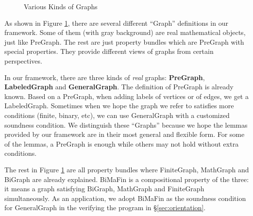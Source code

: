 \begin{figure}[htbp]
\centering
{}
\endpgfgraphicnamed
\vspace{1ex}
\caption{Various Kinds of Graphs}\label{fig:graphs}
\end{figure}

As shown in Figure \ref{fig:graphs}, there are several different
``Graph'' definitions in our framework. Some of them (with gray
background) are real mathematical objects, just like PreGraph. The
rest are just property bundles which are PreGraph with special
properties. They provide different views of graphs from certain
perspectives.

In our framework, there are three kinds of \emph{real}
graphs: \textbf{PreGraph}, \textbf{LabeledGraph}
and \textbf{GeneralGraph}. The definition of PreGraph is already
known. Based on a PreGraph, when adding labels of vertices or of
edges, we get a LabeledGraph. Sometimes when we hope the graph we
refer to satisfies more conditions (finite, binary, etc), we can use
GeneralGraph with a customized soundness condition. We distinguish
these ``Graphs'' because we hope the lemmas provided by our framework
are in their most general and flexible form. For some of the lemmas, a PreGraph is
enough while others may not hold without extra conditions.

The rest in Figure \ref{fig:graphs} are all property bundles where
FiniteGraph, MathGraph and BiGraph are already explained. BiMaFin is a
compositional property of the three: it means a graph satisfying
BiGraph, MathGraph and FiniteGraph simultaneously. As an application,
we adopt BiMaFin as the soundness condition for GeneralGraph in the
verifying the program in \S\ref{sec:orientation}.

